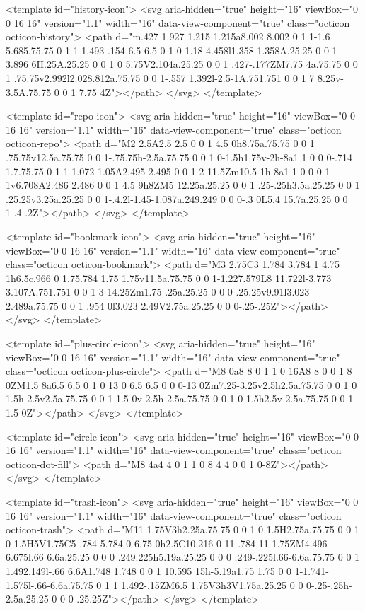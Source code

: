 {{<template id="history-icon">
  <svg aria-hidden="true" height="16" viewBox="0 0 16 16" version="1.1" width="16" data-view-component="true" class="octicon octicon-history">
    <path d="m.427 1.927 1.215 1.215a8.002 8.002 0 1 1-1.6 5.685.75.75 0 1 1 1.493-.154 6.5 6.5 0 1 0 1.18-4.458l1.358 1.358A.25.25 0 0 1 3.896 6H.25A.25.25 0 0 1 0 5.75V2.104a.25.25 0 0 1 .427-.177ZM7.75 4a.75.75 0 0 1 .75.75v2.992l2.028.812a.75.75 0 0 1-.557 1.392l-2.5-1A.751.751 0 0 1 7 8.25v-3.5A.75.75 0 0 1 7.75 4Z"></path>
</svg>
</template>

<template id="repo-icon">
  <svg aria-hidden="true" height="16" viewBox="0 0 16 16" version="1.1" width="16" data-view-component="true" class="octicon octicon-repo">
    <path d="M2 2.5A2.5 2.5 0 0 1 4.5 0h8.75a.75.75 0 0 1 .75.75v12.5a.75.75 0 0 1-.75.75h-2.5a.75.75 0 0 1 0-1.5h1.75v-2h-8a1 1 0 0 0-.714 1.7.75.75 0 1 1-1.072 1.05A2.495 2.495 0 0 1 2 11.5Zm10.5-1h-8a1 1 0 0 0-1 1v6.708A2.486 2.486 0 0 1 4.5 9h8ZM5 12.25a.25.25 0 0 1 .25-.25h3.5a.25.25 0 0 1 .25.25v3.25a.25.25 0 0 1-.4.2l-1.45-1.087a.249.249 0 0 0-.3 0L5.4 15.7a.25.25 0 0 1-.4-.2Z"></path>
</svg>
</template>

<template id="bookmark-icon">
  <svg aria-hidden="true" height="16" viewBox="0 0 16 16" version="1.1" width="16" data-view-component="true" class="octicon octicon-bookmark">
    <path d="M3 2.75C3 1.784 3.784 1 4.75 1h6.5c.966 0 1.75.784 1.75 1.75v11.5a.75.75 0 0 1-1.227.579L8 11.722l-3.773 3.107A.751.751 0 0 1 3 14.25Zm1.75-.25a.25.25 0 0 0-.25.25v9.91l3.023-2.489a.75.75 0 0 1 .954 0l3.023 2.49V2.75a.25.25 0 0 0-.25-.25Z"></path>
</svg>
</template>

<template id="plus-circle-icon">
  <svg aria-hidden="true" height="16" viewBox="0 0 16 16" version="1.1" width="16" data-view-component="true" class="octicon octicon-plus-circle">
    <path d="M8 0a8 8 0 1 1 0 16A8 8 0 0 1 8 0ZM1.5 8a6.5 6.5 0 1 0 13 0 6.5 6.5 0 0 0-13 0Zm7.25-3.25v2.5h2.5a.75.75 0 0 1 0 1.5h-2.5v2.5a.75.75 0 0 1-1.5 0v-2.5h-2.5a.75.75 0 0 1 0-1.5h2.5v-2.5a.75.75 0 0 1 1.5 0Z"></path>
</svg>
</template>

<template id="circle-icon">
  <svg aria-hidden="true" height="16" viewBox="0 0 16 16" version="1.1" width="16" data-view-component="true" class="octicon octicon-dot-fill">
    <path d="M8 4a4 4 0 1 1 0 8 4 4 0 0 1 0-8Z"></path>
</svg>
</template>

<template id="trash-icon">
  <svg aria-hidden="true" height="16" viewBox="0 0 16 16" version="1.1" width="16" data-view-component="true" class="octicon octicon-trash">
    <path d="M11 1.75V3h2.25a.75.75 0 0 1 0 1.5H2.75a.75.75 0 0 1 0-1.5H5V1.75C5 .784 5.784 0 6.75 0h2.5C10.216 0 11 .784 11 1.75ZM4.496 6.675l.66 6.6a.25.25 0 0 0 .249.225h5.19a.25.25 0 0 0 .249-.225l.66-6.6a.75.75 0 0 1 1.492.149l-.66 6.6A1.748 1.748 0 0 1 10.595 15h-5.19a1.75 1.75 0 0 1-1.741-1.575l-.66-6.6a.75.75 0 1 1 1.492-.15ZM6.5 1.75V3h3V1.75a.25.25 0 0 0-.25-.25h-2.5a.25.25 0 0 0-.25.25Z"></path>
</svg>
</template>

}}

